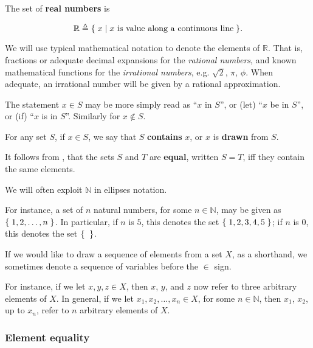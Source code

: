 \begin{definition} The set of \textbf{real numbers} is

$$\mathbb{R}\triangleq\mathopen{}\left\{\mathrel{}{x\mathrel{}\mid\mathrel{}{\text{$x$ is value along a continuous
line}}}\mathrel{}\right\}\mathclose{}.$$

\end{definition}

We will use typical mathematical notation to denote the elements of
$\mathbb{R}$. That is, fractions or adequate decimal expansions for the
\emph{rational numbers}, and known mathematical functions for the
\emph{irrational numbers}, e.g. $\sqrt{2}$, $\pi$, $\phi$. When adequate,
an irrational number will be given by a rational approximation.

The statement $x \in S$ may be more simply read as ``$x$ in $S$'', or (let)
``$x$ be in $S$'', or (if) ``$x$ is in $S$''. Similarly for $x \notin S$.

\begin{definition} For any set $S$, if $x\in S$, we say that $S$
\textbf{contains} $x$, or $x$ is \textbf{drawn} from $S$.\end{definition}

\begin{definition} It follows from , that the sets $S$ and $T$ are
\textbf{equal}, written $S=T$, iff they contain the same elements.
\end{definition}

\begin{remark} We will often exploit $\mathbb{N}$ in ellipses
notation.\end{remark}

For instance, a set of $n$ natural numbers, for some $n\in\mathbb{N}$, may be
given as $\mathopen{}\left\{\mathrel{}{1,2,\ldots,n}\mathrel{}\right\}\mathclose{}$. In particular, if $n$ is $5$, this denotes the
set $\mathopen{}\left\{\mathrel{}{1,2,3,4,5}\mathrel{}\right\}\mathclose{}$; if $n$ is $0$, this denotes the set $\mathopen{}\left\{\mathrel{}{}\mathrel{}\right\}\mathclose{}$.

\begin{notation} If we would like to draw a sequence of elements from a set
$X$, as a shorthand, we sometimes denote a sequence of variables before the
$\in$ sign. \end{notation}

For instance, if we let $x,y,z\in X$, then $x$, $y$, and $z$ now refer to three
arbitrary elements of $X$. In general, if we let $x_1,x_2,\ldots,x_n\in X$, for
some $n\in\mathbb{N}$, then $x_1$, $x_2$, up to $x_n$, refer to $n$ arbitrary
elements of $X$.

\subsubsection{Element equality}

